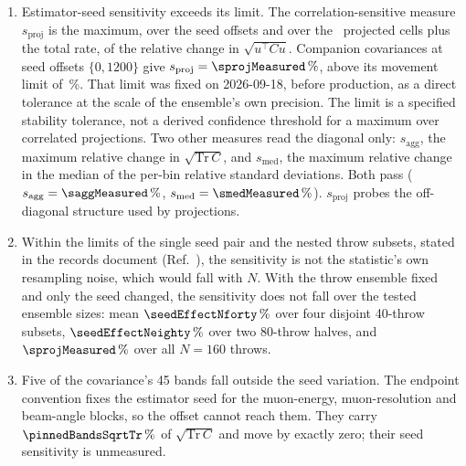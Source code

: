 \begin{enumerate}

\item Estimator-seed sensitivity exceeds its limit. The correlation-sensitive measure $s_{\mathrm{proj}}$ is the maximum, over the seed offsets and over the \zprojCells\ projected cells plus the total rate, of the relative change in $\sqrt{u^{\top}Cu}$. Companion covariances at seed offsets $\{0,1200\}$ give $s_{\mathrm{proj}}=\sprojMeasured\,\%$, above its movement limit of \sprojBound\,\%. That limit was fixed on 2026-09-18, before production, as a direct tolerance at the scale of the ensemble's own precision. The limit is a specified stability tolerance, not a derived confidence threshold for a maximum over correlated projections. Two other measures read the diagonal only: $s_{\mathrm{agg}}$, the maximum relative change in $\sqrt{\mathrm{Tr}\,C}$, and $s_{\mathrm{med}}$, the maximum relative change in the median of the per-bin relative standard deviations. Both pass ($s_{\mathrm{agg}}=\saggMeasured\,\%$, $s_{\mathrm{med}}=\smedMeasured\,\%$). $s_{\mathrm{proj}}$ probes the off-diagonal structure used by projections.
\item Within the limits of the single seed pair and the nested throw subsets, stated in the records document (Ref.~\cite{NoteRecords2026}), the sensitivity is not the statistic's own resampling noise, which would fall with $N$. With the throw ensemble fixed and only the seed changed, the sensitivity does not fall over the tested ensemble sizes: mean $\seedEffectNforty\,\%$ over four disjoint 40-throw subsets, $\seedEffectNeighty\,\%$ over two 80-throw halves, and $\sprojMeasured\,\%$ over all $N=160$ throws.
\item Five of the covariance's 45 bands fall outside the seed variation. The endpoint convention fixes the estimator seed for the muon-energy, muon-resolution and beam-angle blocks, so the offset cannot reach them. They carry $\pinnedBandsSqrtTr\,\%$ of $\sqrt{\mathrm{Tr}\,C}$ and move by exactly zero; their seed sensitivity is unmeasured.

\end{enumerate}
